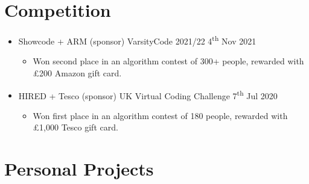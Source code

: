   \section{Competition}

  \begin{itemize}
    \item Showcode + ARM (sponsor) \dashdiv{} VarsityCode 2021/22 \dashdiv{} 4\textsuperscript{th} Nov 2021
    \begin{itemize}
      \item Won second place in an algorithm contest of 300+ people, rewarded with £200 Amazon gift card.
    \end{itemize}
    \item HIRED + Tesco (sponsor) \dashdiv{} UK Virtual Coding Challenge \dashdiv{} 7\textsuperscript{th} Jul 2020
    \begin{itemize}
      \item Won first place in an algorithm contest of 180 people, rewarded with £1,000 Tesco gift card.
    \end{itemize}
  \end{itemize}

  \section{Personal Projects}

